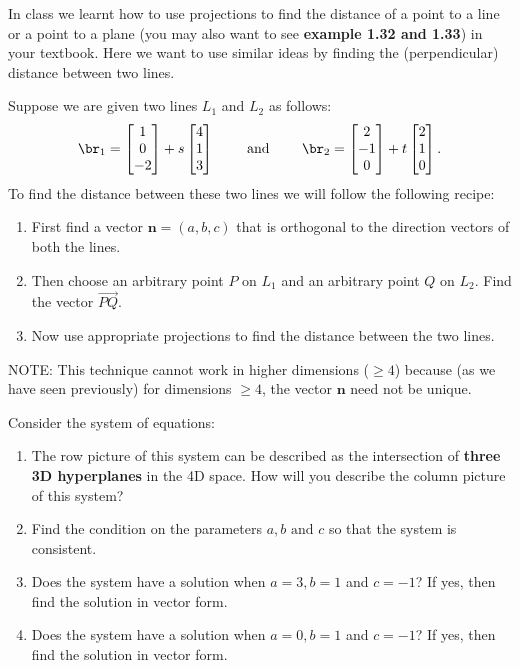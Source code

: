 \documentclass[11pt]{article}
\newcounter{Quesnumb}  %
\newcommand{\problemnum}{%
            \addtocounter{Quesnumb}{1}%
            \arabic{Quesnumb}}
\begin{document}
\begin{problem}{\problemnum}
In class we learnt how to use projections to find the distance of a point to a line or a point to a plane (you may also want to see \textbf{example 1.32 and 1.33}) in your textbook. Here we want to use similar ideas by finding the (perpendicular) distance between two lines.

Suppose we are given two lines $L_1$ and $L_2$ as follows:
\[\br_1=\begin{bmatrix}1\\0\\-2 \end{bmatrix}+s\begin{bmatrix}4\\1\\3 \end{bmatrix} \qquad \text{ and } \qquad \br_2=\begin{bmatrix}2\\-1\\0\end{bmatrix}+t\begin{bmatrix}2\\1\\0\end{bmatrix}.\]
To find the distance between these two lines we will follow the following recipe:
\begin{enumerate}
\item First find a vector $\mathbf{n}=(a,b,c)$ that is orthogonal to the direction vectors of both the lines. 
\item Then choose an arbitrary point $P$ on $L_1$ and an arbitrary point $Q$ on $L_2$. Find the vector $\overrightarrow{PQ}$.
\item Now use appropriate projections to find the distance between the two lines. 
\end{enumerate} 
\textsf{\red NOTE:} This technique cannot work in higher dimensions ($\geq 4$) because (as we have seen previously) for dimensions $\geq 4$, the vector $\mathbf{n}$ need not be unique.
\end{problem}

\begin{problem}{\problemnum}
Consider the system of equations:
\begin{enumerate}
	\item The \textsf{row picture} of this system can be described as the intersection of \textbf{three 3D hyperplanes} in the 4D space. How will you describe the \textsf{column picture} of this system?
	\item Find the condition on the parameters $a, b \textrm{ and } c$ so that the system is consistent.
	\item Does the system have a solution when $a=3, b=1$ and $c=-1$? If yes, then find the solution in vector form.
	\item Does the system have a solution when $a=0, b=1$ and $c=-1$? If yes, then find the solution in vector form.
\end{enumerate}
\end{problem}
\end{document}
